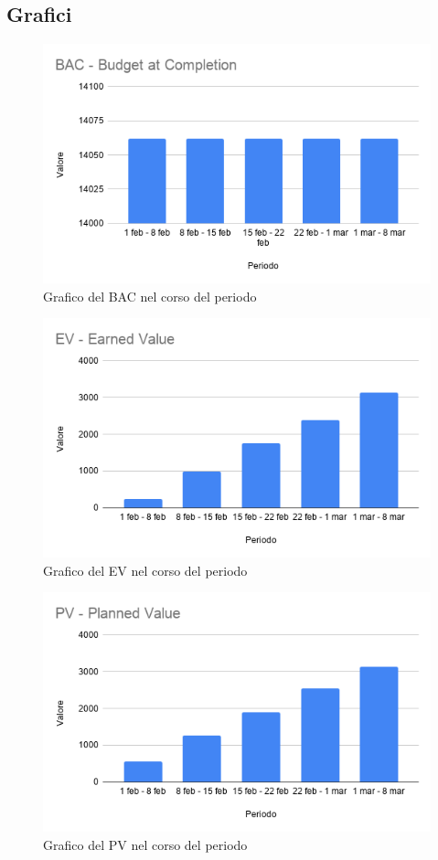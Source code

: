 	\subsection{Grafici}
	\begin{figure}[H]
	\centering
	\includegraphics[width=0.7\linewidth]{res/images/BAC.png}
	\caption{Grafico del BAC nel corso del periodo}
	\label{fig:Figura1}
\end{figure}

\begin{figure}[H]
	\centering
	\includegraphics[width=0.7\linewidth]{res/images/EV.png}
	\caption{Grafico del EV nel corso del periodo}
	\label{fig:Figura2}
\end{figure}

\begin{figure}[H]
	\centering
	\includegraphics[width=0.7\linewidth]{res/images/PV.png}
	\caption{Grafico del PV nel corso del periodo}
	\label{fig:Figura3}
\end{figure}

